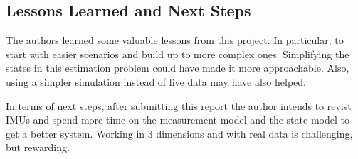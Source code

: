\documentclass[conference]{IEEEtran}
\begin{document}
\subsection{Lessons Learned and Next Steps}

The authors learned some valuable lessons from this project. In particular, to start with easier scenarios and build up to more complex ones. Simplifying the states in this estimation problem could have made it more approachable. Also, using a simpler simulation instead of live data may have also helped.

In terms of next steps, after submitting this report the author intends to revist IMUs and spend more time on the measurement model and the state model to get a better system. Working in 3 dimensions and with real data is challenging, but rewarding.
\end{document}
